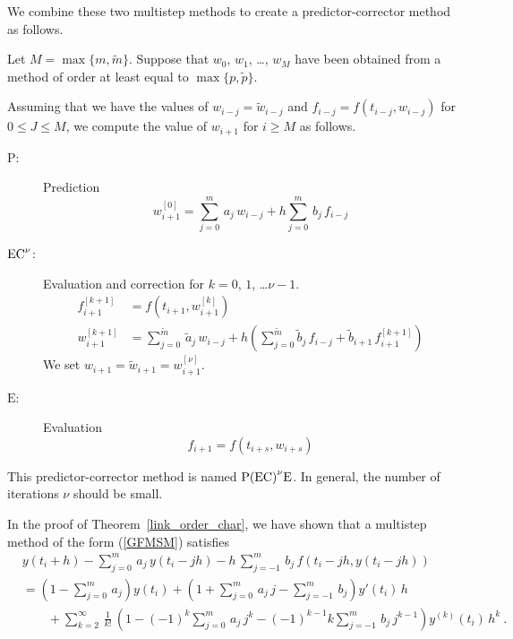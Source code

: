 We combine these two multistep methods to create a predictor-corrector
method as follows.

Let $M = \max\{m,\tilde{m}\}$.  Suppose that $w_0$, $w_1$, \ldots,
$w_M$ have been obtained from a method of order at least equal to
$\max\{p,\tilde{p}\}$.

Assuming that we have the values of $w_{i-j} = \tilde{w}_{i-j}$ and
$f_{i-j} = f(t_{i-j},w_{i-j})$ for $0\leq J \leq M$, we compute the value of
$w_{i+1}$ for $i\geq M$ as
follows.
\begin{description}
\item[$\mathrm{P}$:] Prediction
\begin{equation} \label{Pred0}
w_{i+1}^{[0]} = \sum_{j=0}^m\,a_j\,w_{i-j} + h \sum_{j=0}^m\,b_j\,f_{i-j}
\end{equation}
\item[$\displaystyle \mathrm{EC}^{\nu}$:] Evaluation and correction
for $k=0$, $1$, \ldots $\nu-1$. 
\begin{align}
f_{i+1}^{[k+1]} &= f(t_{i+1},w_{i+1}^{[k]}) \nonumber \\
w_{i+1}^{[k+1]} &= \sum_{j=0}^{\tilde{m}}\,\tilde{a}_j\,w_{i-j} + h\left(
\sum_{j=0}^{\tilde{m}} \tilde{b}_j\,f_{i-j} + \tilde{b}_{i+1}\,f^{[k+1]}_{i+1}
\right)\label{Corr0}
\end{align}
We set $w_{i+1} = \tilde{w}_{i+1} = w_{i+1}^{[\nu]}$.
\item[$\mathrm{E}$:] Evaluation
\[
f_{i+1} = f(t_{i+s},w_{i+s})
\]
\end{description}
This predictor-corrector method is named
$\displaystyle \mathrm{P(EC)}^{\nu}\mathrm{E}$.
In general, the number of iterations $\nu$ should be small.

In the proof of Theorem~\ref{link_order_char}, we have shown that a
multistep method of the form (\ref{GFMSM}) satisfies
\begin{equation}\label{GMSMdev}
\begin{split}
& y(t_i+h) - \sum_{j=0}^m\,a_j\,y(t_i-jh)
-h\,\sum_{j=-1}^m\,b_j\,f(t_i-jh,y(t_i-jh)) \\
&= \left( 1 - \sum_{j=0}^m\,a_j \right) y(t_i)
+ \left( 1 + \sum_{j=0}^m\,a_j\,j - \sum_{j=-1}^m\,b_j\right) y'(t_i)\,h \\
&\qquad
+ \sum_{k=2}^\infty\,\frac{1}{k!}\,\left( 1 - (-1)^k \sum_{j=0}^m\,a_j\,j^k
- (-1)^{k-1} k \sum_{j=-1}^m\,b_j\, j^{k-1}\right) y^{(k)}(t_i)\,h^k \ .
\end{split}
\end{equation}

